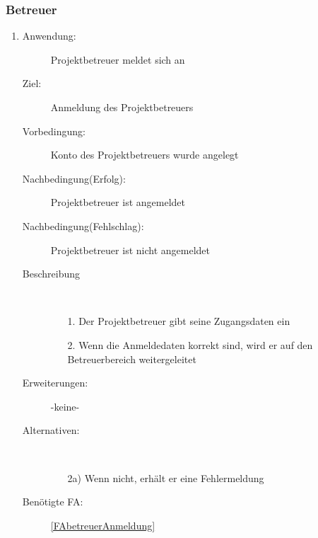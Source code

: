 \documentclass[parskip=full]{scrartcl}
\newcommand{\swtLabel}[1]{\textbf{/#1\arabic*0/}}
\begin{document}
\subsubsection{Betreuer}
\begin{enumerate} [label=\swtLabel{B}]
  \item \label{UCbetreuerAnmeldung}
	 \begin{description}
		\item[Anwendung:] \gls{Projektbetreuer} meldet sich an
  		\item[Ziel:] Anmeldung des \gls{Projektbetreuer}s
  		\item[Vorbedingung:] Konto des \gls{Projektbetreuer}s wurde angelegt
  		\item[Nachbedingung(Erfolg):] \gls{Projektbetreuer} ist angemeldet
  		\item[Nachbedingung(Fehlschlag):] \gls{Projektbetreuer} ist nicht angemeldet
  		\item[Beschreibung]~
  		\begin{enumerate}
  			\item[1.] Der \gls{Projektbetreuer} gibt seine Zugangsdaten ein
  			\item[2.] Wenn die Anmeldedaten korrekt sind, wird er auf den
  			Betreuerbereich weitergeleitet
  		\end{enumerate}
  		\item[Erweiterungen:] -keine-
  		\item[Alternativen:] ~
  		\begin{enumerate}
  		  \item[2a)] Wenn nicht, erhält er eine Fehlermeldung
  		\end{enumerate}  
  		\item[Benötigte FA:] \ref{FAbetreuerAnmeldung}
  	\end{description}
   

\end{enumerate}
\end{document}
